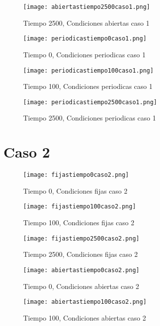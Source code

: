 \documentclass{article}
\begin{document}
\begin{figure}
 \centering
\texttt{[image: abiertastiempo2500caso1.png]}
 \caption{ Tiempo 2500, Condiciones abiertas caso 1}
 \end{figure}


\begin{figure}
 \centering
\texttt{[image: periodicastiempo0caso1.png]}
 \caption{ Tiempo 0, Condiciones periodicas caso 1}
 \end{figure}

\begin{figure}
 \centering
\texttt{[image: periodicastiempo100caso1.png]}
 \caption{ Tiempo 100, Condiciones periodicas caso 1}
 \end{figure}

\begin{figure}
 \centering
\texttt{[image: periodicastiempo2500caso1.png]}
 \caption{ Tiempo 2500, Condiciones periodicas caso 1}
 \end{figure}

\section{Caso 2}
\begin{figure}
 \centering
\texttt{[image: fijastiempo0caso2.png]}
 \caption{ Tiempo 0, Condiciones fijas caso 2}
 \end{figure}

\begin{figure}
 \centering
\texttt{[image: fijastiempo100caso2.png]}
 \caption{ Tiempo 100, Condiciones fijas caso 2}
 \end{figure}

\begin{figure}
 \centering
\texttt{[image: fijastiempo2500caso2.png]}
 \caption{ Tiempo 2500, Condiciones fijas caso 2}
 \end{figure}



\begin{figure}
 \centering
\texttt{[image: abiertastiempo0caso2.png]}
 \caption{ Tiempo 0, Condiciones abiertas caso 2}
 \end{figure}

\begin{figure}
 \centering
\texttt{[image: abiertastiempo100caso2.png]}
 \caption{ Tiempo 100, Condiciones abiertas caso 2}
 \end{figure}
\end{document}
